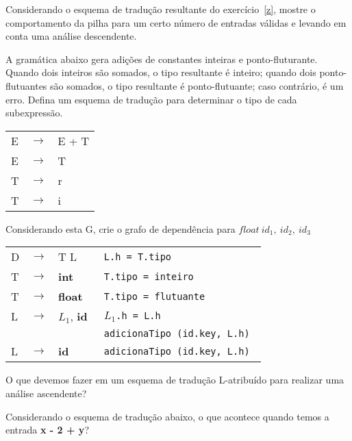 \documentclass{compiladores}
\begin{document}
\begin{listanumerada}
\item Considerando o esquema de tradução resultante do
  exercício~\ref{z}, mostre o comportamento da pilha para um certo
  número de entradas válidas e levando em conta uma análise
  descendente.

\item A gramática abaixo gera adições de constantes inteiras e
  ponto-fluturante. Quando dois inteiros são somados, o tipo
  resultante é inteiro; quando dois ponto-flutuantes são somados, o
  tipo resultante é ponto-flutuante; caso contrário, é um erro. Defina
  um esquema de tradução para determinar o tipo de cada subexpressão.

  \begin{tabular}{lll}
    E & $\rightarrow$ & E + T \\
    E & $\rightarrow$ & T \\
    T & $\rightarrow$ & r \\
    T & $\rightarrow$ & i \\
  \end{tabular}

\item Considerando esta G, crie o grafo de dependência para $float\ id_1,\ id_2,\ id_3$

\begin{tabular}{llll}
 D  &  $\rightarrow$  &  T L                 &  \texttt{ L.h = T.tipo }                \\
 T  &  $\rightarrow$  &  \textbf{int}        &  \texttt{ T.tipo = inteiro}             \\
 T  &  $\rightarrow$  &  \textbf{float}      &  \texttt{ T.tipo = flutuante}           \\
 L  &  $\rightarrow$  &  $L_1$, \textbf{id}  &  \texttt{ $L_1$.h = L.h }               \\
    &                 &                      &  \texttt{ adicionaTipo (id.key, L.h) }  \\
 L  &  $\rightarrow$  &  \textbf{id}         &  \texttt{ adicionaTipo (id.key, L.h)}   \\
\end{tabular}

\item O que devemos fazer em um esquema de tradução L-atribuído para
  realizar uma análise ascendente?

\item \label{t} Considerando o esquema de tradução abaixo, o que acontece quando
  temos a entrada {\bf x - 2 + y}?


\end{listanumerada}
\end{document}

